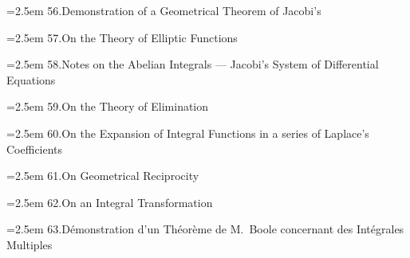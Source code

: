 \documentclass[11pt]{article}
\begin{document}
\noindent\hangindent=2.5em
56.\quad Demonstration of a Geometrical Theorem of Jacobi's\par
\hspace{1.5em}{\small Camb.\ and Dubl.\ Math.\ Jour.\ t.~iii.\ (1848), pp.~48, 49}\par

\noindent\hangindent=2.5em
57.\quad On the Theory of Elliptic Functions\par
\hspace{1.5em}{\small Camb.\ and Dubl.\ Math.\ Jour.\ t.~iii.\ (1848), pp.~50, 51}\par

\noindent\hangindent=2.5em
58.\quad Notes on the Abelian Integrals --- Jacobi's System of Differential Equations\par
\hspace{1.5em}{\small Camb.\ and Dubl.\ Math.\ Jour.\ t.~iii.\ (1848), pp.~51--54}\par

\noindent\hangindent=2.5em
59.\quad On the Theory of Elimination\par
\hspace{1.5em}{\small Camb.\ and Dubl.\ Math.\ Jour.\ t.~iii.\ (1848), pp.~116--120}\par

\noindent\hangindent=2.5em
60.\quad On the Expansion of Integral Functions in a series of Laplace's Coefficients\par
\hspace{1.5em}{\small Camb.\ and Dubl.\ Math.\ Jour.\ t.~iii.\ (1848), pp.~120, 121}\par

\bigskip

\noindent\hangindent=2.5em
61.\quad On Geometrical Reciprocity\par
\hspace{1.5em}{\small Camb.\ and Dubl.\ Math.\ Jour.\ t.~iii.\ (1848), pp.~173--179}\par

\noindent\hangindent=2.5em
62.\quad On an Integral Transformation\par
\hspace{1.5em}{\small Camb.\ and Dubl.\ Math.\ Jour.\ t.~iii.\ (1848), pp.~286, 287}\par

\noindent\hangindent=2.5em
63.\quad D\'emonstration d'un Th\'eor\`eme de M.\ Boole concernant des Int\'egrales Multiples\par
\hspace{1.5em}{\small Liouville, t.~xiii.\ (1848), pp.~245--248}\par
\end{document}
